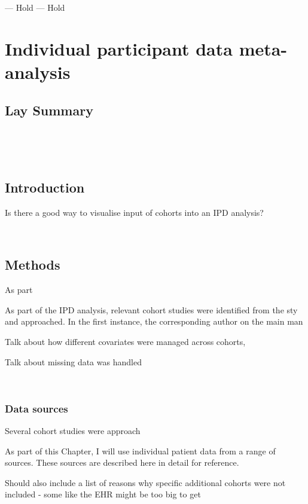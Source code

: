 \documentclass[a4paper, twoside]{templates/ociamthesis}
\begin{document}
--- Hold --- Hold

\hypertarget{ipd-heading}{%
\chapter{Individual participant data meta-analysis}\label{ipd-heading}}

\minitoc 

\hypertarget{lay-summary-4}{%
\section{Lay Summary}\label{lay-summary-4}}

~

~

\hypertarget{introduction-2}{%
\section{Introduction}\label{introduction-2}}

Is there a good way to visualise input of cohorts into an IPD analysis?

~

\hypertarget{methods-2}{%
\section{Methods}\label{methods-2}}

As part

As part of the IPD analysis, relevant cohort studies were identified from the sty and approached. In the first instance, the corresponding author on the main man

Talk about how different covariates were managed across cohorts,

Talk about missing data was handled

~

\hypertarget{data-sources}{%
\subsection{Data sources}\label{data-sources}}

Several cohort studies were approach

As part of this Chapter, I will use individual patient data from a range of sources. These sources are described here in detail for reference.

Should also include a list of reasons why specific additional cohorts were not included - some like the EHR might be too big to get
\end{document}
